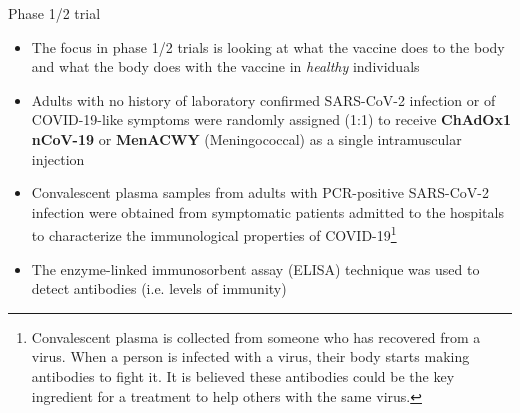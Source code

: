\documentclass[10pt]{beamer}\usepackage[]{graphicx}\usepackage[]{color}
\begin{document}
\begin{frame}{Phase 1/2 trial}
	\begin{itemize}
		\item The focus in phase 1/2 trials is looking at what the vaccine does to the body and what the body does with the vaccine in \textit{healthy} individuals
		\item Adults with no history of laboratory confirmed SARS-CoV-2 infection or of COVID-19-like symptoms were randomly assigned (1:1) to receive \textbf{ChAdOx1 nCoV-19} or \textbf{MenACWY} (Meningococcal) as a single intramuscular injection
		\item Convalescent plasma samples from adults with PCR-positive SARS-CoV-2 infection were obtained from symptomatic patients admitted to the hospitals to characterize the
		immunological properties of COVID-19\footnote{\tiny{Convalescent plasma is collected from someone who has recovered from a virus. When a person is infected with a virus, their body starts making antibodies to fight it. It is believed these antibodies could be the key ingredient for a treatment to help others with the same virus.}}
		\item The enzyme-linked immunosorbent assay (ELISA) technique was used to detect antibodies (i.e. levels of immunity)
		
	\end{itemize}
\end{frame}
\end{document}
